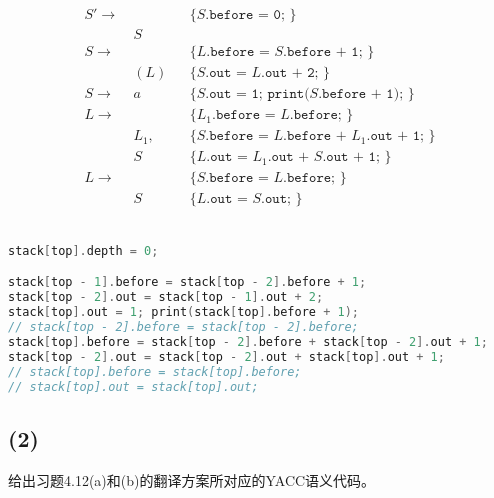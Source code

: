 \documentclass{article}
\begin{document}
\begin{multicols}{2}
    \begin{align*}
        S' \rightarrow\ & && \texttt{\{ }S\texttt{.before = 0; \}}\\
                        &S&& \\
        S \rightarrow\ & &&\texttt{\{ }L\texttt{.before = }S\texttt{.before + 1; \}}\\
                        &(L)&& \texttt{\{ }S\texttt{.out = }L\texttt{.out + 2; \}} \\
        S \rightarrow\ &a&& \texttt{\{ }S\texttt{.out = 1; print(}S\texttt{.before + 1); \}}\\
        L \rightarrow\ & && \texttt{\{ }L_1\texttt{.before = }L\texttt{.before; \}}\\
                        &L_1,&& \texttt{\{ }S\texttt{.before = }L\texttt{.before + }L_1\texttt{.out + 1; \}}\\
                        &S&& \texttt{\{ }L\texttt{.out = }L_1\texttt{.out + }S\texttt{.out + 1; \}} \\
        L \rightarrow\ & &&\texttt{\{ }S\texttt{.before = }L\texttt{.before; \}}\\
                        &S&& \texttt{\{ }L\texttt{.out = }S\texttt{.out; \}}
    \end{align*}
    \\
    \begin{lstlisting}[language = C,
        keywordstyle=\bfseries\color{blue!70},
        commentstyle=\color{white!80!black},
        frame=shadowbox,
        framerule = 1pt,
        xleftmargin = 2mm,
        rulesepcolor = \color{white},
        rulecolor = \color{white},
        basicstyle=\ttfamily\scriptsize,
        lineskip = 16.5pt,
        escapeinside=``]
stack[top].depth = 0;

stack[top - 1].before = stack[top - 2].before + 1;
stack[top - 2].out = stack[top - 1].out + 2;
stack[top].out = 1; print(stack[top].before + 1);
// stack[top - 2].before = stack[top - 2].before;
stack[top].before = stack[top - 2].before + stack[top - 2].out + 1;
stack[top - 2].out = stack[top - 2].out + stack[top].out + 1;
// stack[top].before = stack[top].before;
// stack[top].out = stack[top].out;
    \end{lstlisting}
\end{multicols}
\restoregeometry

\subsection*{(2)}
给出习题4.12(a)和(b)的翻译方案所对应的YACC语义代码。
\end{document}
